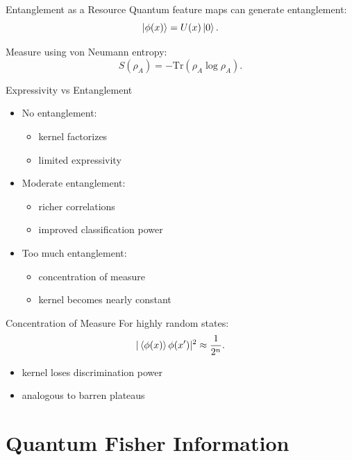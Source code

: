 \documentclass{beamer}
\begin{document}
\begin{frame}{Entanglement as a Resource}
Quantum feature maps can generate entanglement:
\[
\ket{\phi(x)} = U(x)\ket{0}.
\]

Measure using von Neumann entropy:
\[
S(\rho_A) = -\mathrm{Tr}(\rho_A \log \rho_A).
\]
\end{frame}


\begin{frame}{Expressivity vs Entanglement}
\begin{itemize}
\item No entanglement:
\begin{itemize}
\item kernel factorizes
\item limited expressivity
\end{itemize}
\item Moderate entanglement:
\begin{itemize}
\item richer correlations
\item improved classification power
\end{itemize}
\item Too much entanglement:
\begin{itemize}
\item concentration of measure
\item kernel becomes nearly constant
\end{itemize}
\end{itemize}
\end{frame}


\begin{frame}{Concentration of Measure}
For highly random states:
\[
|\braket{\phi(x)}{\phi(x')}|^2 \approx \frac{1}{2^n}.
\]

\begin{itemize}
\item kernel loses discrimination power
\item analogous to barren plateaus
\end{itemize}
\end{frame}


\section{Quantum Fisher Information}
\end{document}
